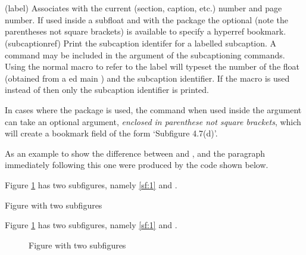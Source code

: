 \begin{syntax}
\cmd{\label} \\
\cmd{\subcaptionref} \\
\end{syntax}
\glossary(label)%
  {}%
  {Associates  with the current (section, caption, etc.)
   number and page number. If used inside a subfloat and with the 
   package the optional  (note the parentheses
  not square brackets) is available to specify a hyperref bookmark.}
\glossary(subcaptionref)%
  {}%
  {Print the subcaption identifer for a  labelled subcaption.}
A \cmd{\label} command may be included in the  argument
of the subcaptioning commands. 
Using the normal \cmd{\ref} macro to
refer to the label will typeset the number of the float (obtained
from a \cmd{\label}ed main \cmd{\caption}) and the subcaption
identifier. If the \cmd{\subcaptionref} macro is used instead of 
\cmd{\ref} then only the subcaption identifier is printed.

    In cases where the  package is used, the \cmd{\label}
command when used inside the  argument can take an optional
 argument, 
\emph{enclosed in parenthese \emph{not} square brackets},
which will create a bookmark field of the form `Subfigure 4.7(d)'.

    As an example to show the difference between \cmd{\subcaptionref} and
\cmd{\ref},  and the paragraph immediately
following this one were produced by the code shown below.

    Figure \ref{fig:twosubfig} has two subfigures,
namely \ref{sf:1} and .
\begin{shadefigure}
{}
\hfill
{}
\caption{Figure with two subfigures} \label{fig:twosubfig}
\end{shadefigure}
\begin{lcode}
    Figure \ref{fig:twosubfig} has two subfigures,
namely \ref{sf:1} and .
\begin{figure}
\centering
{}
\hfill
{}
\caption{Figure with two subfigures} \label{fig:twosubfig}
\end{figure}
\end{lcode}

